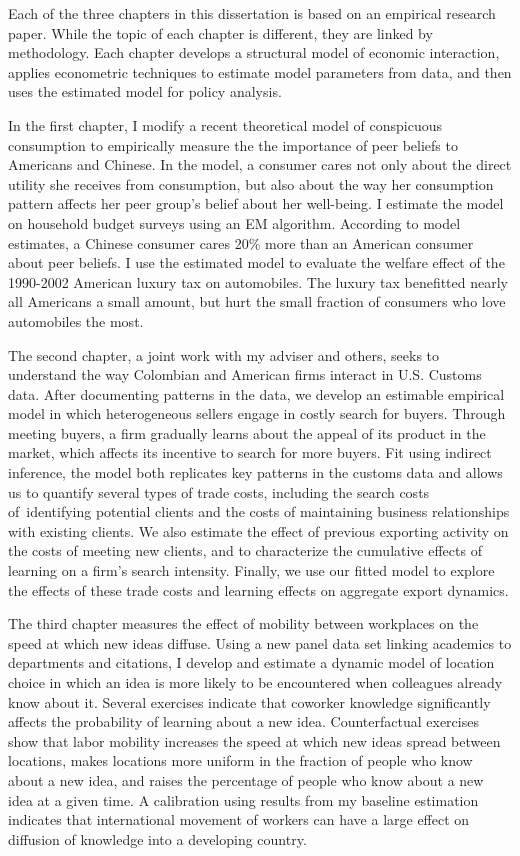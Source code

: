 
Each of the three chapters in this dissertation is based on an empirical research paper.  While the topic of each chapter is different, they are linked by methodology.  Each chapter develops a structural model of economic interaction, applies econometric techniques to estimate model parameters from data, and then uses the estimated model for policy analysis.

In the first chapter, I modify a recent theoretical model of conspicuous consumption to empirically measure the the importance of peer beliefs to Americans and Chinese.  In the model, a consumer cares not only about the direct utility she receives from consumption, but also about the way her consumption pattern affects her peer group's belief about her well-being.  I estimate the model on household budget surveys using an EM algorithm. According to model estimates, a Chinese consumer cares 20\% more than an American consumer about peer beliefs.  I use the estimated model to evaluate the welfare effect of the 1990-2002 American luxury tax on automobiles.  The luxury tax benefitted nearly all Americans a small amount, but hurt the small fraction of consumers who love automobiles the most.

The second chapter, a joint work with my adviser and others, seeks to understand the way Colombian and American firms interact in U.S. Customs data.  After documenting patterns in the data, we develop an estimable empirical model in which heterogeneous sellers engage in costly search for buyers.  Through meeting buyers, a firm gradually learns about the appeal of its product in the market, which affects its incentive to search for more buyers.  Fit using indirect inference, the model both replicates key patterns in the customs data and allows us to quantify several types of trade costs, including the search costs of\ identifying potential clients and the costs of maintaining business relationships with existing clients. We also estimate the effect of previous exporting activity on the costs of meeting new clients, and to characterize the cumulative effects of learning on a firm's search intensity. Finally, we use our fitted model to explore the effects of these trade costs and learning effects on aggregate export dynamics.

The third chapter measures the effect of mobility between workplaces on the speed at which new ideas diffuse.  Using a new panel data set linking academics to departments and citations, I develop and estimate a dynamic model of location choice in which an idea is more likely to be encountered when colleagues already know about it.  Several exercises indicate that coworker knowledge significantly affects the probability of learning about a new idea.  Counterfactual exercises show that labor mobility increases the speed at which new ideas spread between locations, makes locations more uniform in the fraction of people who know about a new idea, and raises the percentage of people who know about a new idea at a given time.  A calibration using results from my baseline estimation indicates that international movement of workers can have a large effect on diffusion of knowledge into a developing country.


